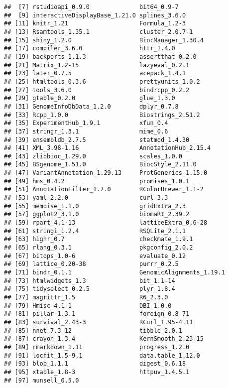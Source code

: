 \documentclass{report}\usepackage[]{graphicx}\usepackage[usenames,dvipsnames]{color}
\newenvironment{knitrout}{}{} %
\begin{document}
\begin{knitrout}
\begin{kframe}
\begin{verbatim}
##  [7] rstudioapi_0.9.0              bit64_0.9-7                  
##  [9] interactiveDisplayBase_1.21.0 splines_3.6.0                
## [11] knitr_1.21                    Formula_1.2-3                
## [13] Rsamtools_1.35.1              cluster_2.0.7-1              
## [15] shiny_1.2.0                   BiocManager_1.30.4           
## [17] compiler_3.6.0                httr_1.4.0                   
## [19] backports_1.1.3               assertthat_0.2.0             
## [21] Matrix_1.2-15                 lazyeval_0.2.1               
## [23] later_0.7.5                   acepack_1.4.1                
## [25] htmltools_0.3.6               prettyunits_1.0.2            
## [27] tools_3.6.0                   bindrcpp_0.2.2               
## [29] gtable_0.2.0                  glue_1.3.0                   
## [31] GenomeInfoDbData_1.2.0        dplyr_0.7.8                  
## [33] Rcpp_1.0.0                    Biostrings_2.51.2            
## [35] ExperimentHub_1.9.1           xfun_0.4                     
## [37] stringr_1.3.1                 mime_0.6                     
## [39] ensembldb_2.7.5               statmod_1.4.30               
## [41] XML_3.98-1.16                 AnnotationHub_2.15.4         
## [43] zlibbioc_1.29.0               scales_1.0.0                 
## [45] BSgenome_1.51.0               BiocStyle_2.11.0             
## [47] VariantAnnotation_1.29.13     ProtGenerics_1.15.0          
## [49] hms_0.4.2                     promises_1.0.1               
## [51] AnnotationFilter_1.7.0        RColorBrewer_1.1-2           
## [53] yaml_2.2.0                    curl_3.3                     
## [55] memoise_1.1.0                 gridExtra_2.3                
## [57] ggplot2_3.1.0                 biomaRt_2.39.2               
## [59] rpart_4.1-13                  latticeExtra_0.6-28          
## [61] stringi_1.2.4                 RSQLite_2.1.1                
## [63] highr_0.7                     checkmate_1.9.1              
## [65] rlang_0.3.1                   pkgconfig_2.0.2              
## [67] bitops_1.0-6                  evaluate_0.12                
## [69] lattice_0.20-38               purrr_0.2.5                  
## [71] bindr_0.1.1                   GenomicAlignments_1.19.1     
## [73] htmlwidgets_1.3               bit_1.1-14                   
## [75] tidyselect_0.2.5              plyr_1.8.4                   
## [77] magrittr_1.5                  R6_2.3.0                     
## [79] Hmisc_4.1-1                   DBI_1.0.0                    
## [81] pillar_1.3.1                  foreign_0.8-71               
## [83] survival_2.43-3               RCurl_1.95-4.11              
## [85] nnet_7.3-12                   tibble_2.0.1                 
## [87] crayon_1.3.4                  KernSmooth_2.23-15           
## [89] rmarkdown_1.11                progress_1.2.0               
## [91] locfit_1.5-9.1                data.table_1.12.0            
## [93] blob_1.1.1                    digest_0.6.18                
## [95] xtable_1.8-3                  httpuv_1.4.5.1               
## [97] munsell_0.5.0
\end{verbatim}
\end{kframe}
\end{knitrout}


\end{document}
